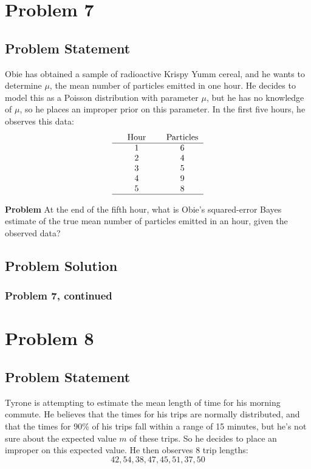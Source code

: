 \documentclass[12pt]{article}
\theoremstyle{definition}
\begin{document}
\newpage
\section*{Problem 7}

\subsection*{Problem Statement}

Obie has obtained a sample of radioactive Krispy Yumm cereal, and he wants to determine $\mu$, the mean number of particles emitted in one hour. He decides to model this as a Poisson distribution with parameter $\mu$, but he has no knowledge of $\mu$, so he places an improper prior on this parameter. In the first five hours, he observes this data:
$$
\begin{tabular}{ccccc}
& Hour & & Particles\\
\hline
& 1 & & 6\\
& 2 & & 4\\
& 3 & & 5\\
& 4 & & 9\\
& 5 & & 8\\
\hline
\end{tabular}
$$

\bigskip
\noindent
{\bf Problem} At the end of the fifth hour, what is Obie's squared-error Bayes estimate of the true mean number of particles emitted in an hour, given the observed data?


\subsection*{Problem Solution}


\newpage
\subsubsection*{Problem 7, continued}




\newpage
\section*{Problem 8}

\subsection*{Problem Statement}

Tyrone is attempting to estimate the mean length of time for his morning commute. He believes that the times for his trips are normally distributed, and that the times for 90\% of his trips fall within a range of 15 minutes, but he's not sure about the expected value $m$ of these trips. So he decides to place an improper on this expected value. He then observes 8 trip lengths:
$$
42, 54, 38, 47, 45, 51, 37, 50
$$
\end{document}
